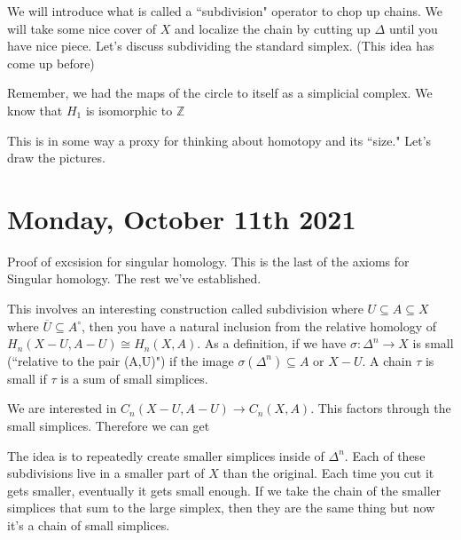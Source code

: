 \documentclass[10pt]{article}
\theoremstyle{definition}
\begin{document}
	We will introduce what is called a ``subdivision" operator to chop up chains. We will take some nice cover of $X$ and localize the chain by cutting up $\Delta$ until you have nice piece. Let's discuss subdividing the standard simplex. (This idea has come up before)
	
	
	Remember, we had the maps of the circle to itself as a simplicial complex. We know that $H_1$ is isomorphic to $\mathbb{Z}$
	
	This is in some way a proxy for thinking about homotopy and its ``size." Let's draw the pictures. 
	
	\section{Monday, October 11th 2021}
	Proof of excsision for singular homology. This is the last of the axioms for Singular homology. The rest we've established.
	
	This involves an interesting construction called subdivision where $U\subseteq A\subseteq X$ where $\overline{U}\subseteq A^\circ$, then you have a natural inclusion from the relative homology of $H_n(X-U, A-U)\cong H_n(X,A)$. As a definition, if we have $\sigma:\Delta^n\to X$ is small (``relative to the pair (A,U)") if the image $\sigma(\Delta^n)\subseteq A$ or $X-U$. A chain $\tau$ is small if $\tau$ is a sum of small simplices. 
	
	We are interested in $C_n(X-U,A-U)\to C_n(X,A)$. This factors through the small simplices. Therefore we can get\begin{center}
	\end{center}
	The idea is to repeatedly create smaller simplices inside of $\Delta^n$. Each of these subdivisions live in a smaller part of $X$ than the original. Each time you cut it gets smaller, eventually it gets small enough. If we take the chain of the smaller simplices that sum to the large simplex, then they are the same thing but now it's a chain of small simplices. 
	
\end{document}

